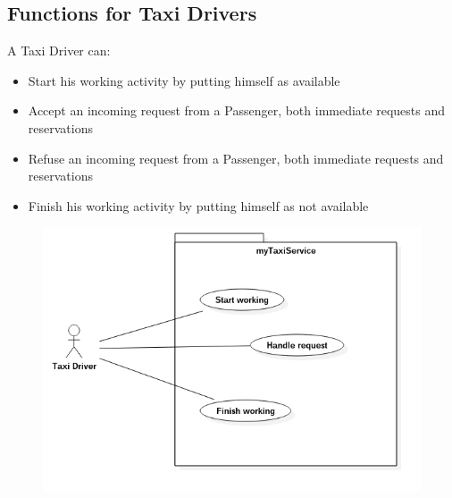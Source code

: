 \subsection{Functions for Taxi Drivers}
A Taxi Driver can:
\begin{itemize}
\item Start his working activity by putting himself as available
\item Accept an incoming request from a Passenger, both immediate requests and reservations
\item Refuse an incoming request from a Passenger, both immediate requests and reservations
\item Finish his working activity by putting himself as not available
\end{itemize}
\begin{figure}[H]
\centering
\includegraphics[scale=0.5]{Images/uc_highLevel_taxiDriver}
\end{figure}